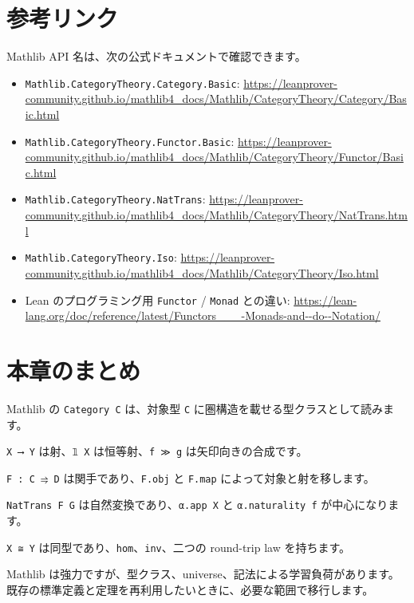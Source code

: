 \section{参考リンク}

Mathlib API 名は、次の公式ドキュメントで確認できます。

\begin{itemize}
\item \texttt{Mathlib.CategoryTheory.Category.Basic}: \url{https://leanprover-community.github.io/mathlib4_docs/Mathlib/CategoryTheory/Category/Basic.html}
\item \texttt{Mathlib.CategoryTheory.Functor.Basic}: \url{https://leanprover-community.github.io/mathlib4_docs/Mathlib/CategoryTheory/Functor/Basic.html}
\item \texttt{Mathlib.CategoryTheory.NatTrans}: \url{https://leanprover-community.github.io/mathlib4_docs/Mathlib/CategoryTheory/NatTrans.html}
\item \texttt{Mathlib.CategoryTheory.Iso}: \url{https://leanprover-community.github.io/mathlib4_docs/Mathlib/CategoryTheory/Iso.html}
\item Lean のプログラミング用 \texttt{Functor} / \texttt{Monad} との違い: \url{https://lean-lang.org/doc/reference/latest/Functors___-Monads-and--do--Notation/}
\end{itemize}

\section{本章のまとめ}

Mathlib の \texttt{Category C} は、対象型 \texttt{C} に圏構造を載せる型クラスとして読みます。

\texttt{X ⟶ Y} は射、\texttt{𝟙 X} は恒等射、\texttt{f ≫ g} は矢印向きの合成です。

\texttt{F : C ⥤ D} は関手であり、\texttt{F.obj} と \texttt{F.map} によって対象と射を移します。

\texttt{NatTrans F G} は自然変換であり、\texttt{α.app X} と \texttt{α.naturality f} が中心になります。

\texttt{X ≅ Y} は同型であり、\texttt{hom}、\texttt{inv}、二つの round-trip law を持ちます。

Mathlib は強力ですが、型クラス、universe、記法による学習負荷があります。
既存の標準定義と定理を再利用したいときに、必要な範囲で移行します。
